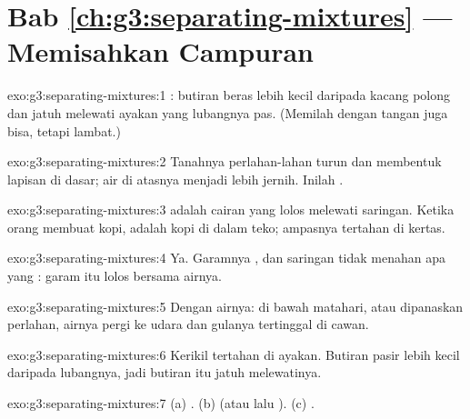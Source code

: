 \section*{Bab \ref{ch:g3:separating-mixtures} --- Memisahkan Campuran}

\begin{solution}{exo:g3:separating-mixtures:1}
: butiran beras lebih kecil daripada kacang polong dan jatuh
melewati ayakan yang lubangnya pas. (Memilah dengan tangan juga
bisa, tetapi lambat.)
\end{solution}

\begin{solution}{exo:g3:separating-mixtures:2}
Tanahnya perlahan-lahan turun dan membentuk lapisan di dasar; air di
atasnya menjadi lebih jernih. Inilah .
\end{solution}

\begin{solution}{exo:g3:separating-mixtures:3}
 adalah cairan yang lolos melewati saringan. Ketika orang
membuat kopi,  adalah kopi di dalam teko; ampasnya tertahan
di kertas.
\end{solution}

\begin{solution}{exo:g3:separating-mixtures:4}
Ya. Garamnya , dan saringan tidak menahan apa yang : garam
itu lolos bersama airnya.
\end{solution}

\begin{solution}{exo:g3:separating-mixtures:5}
Dengan  airnya: di bawah matahari, atau dipanaskan perlahan,
airnya pergi ke udara dan gulanya tertinggal di cawan.
\end{solution}

\begin{solution}{exo:g3:separating-mixtures:6}
Kerikil tertahan di ayakan. Butiran pasir lebih kecil daripada
lubangnya, jadi butiran itu jatuh melewatinya.
\end{solution}

\begin{solution}{exo:g3:separating-mixtures:7}
(a) . (b)  (atau  lalu ).
(c) .
\end{solution}

